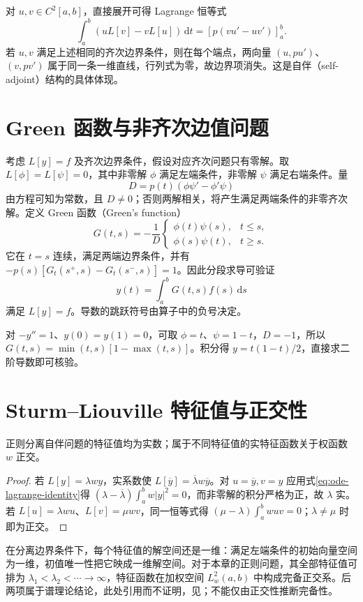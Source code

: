\documentclass[UTF8,12pt,a4paper,fontset=fandol]{ctexbook}
\begin{document}
对 $u,v\in C^2[a,b]$，直接展开可得 Lagrange 恒等式
\begin{equation}
 \int_a^b(uL[v]-vL[u])\,\mathrm dt
 =[p(vu'-uv')]_a^b.
 \label{eq:ode-lagrange-identity}
\end{equation}
若 $u,v$ 满足上述相同的齐次边界条件，则在每个端点，两向量 $(u,pu')$、$(v,pv')$ 属于同一条一维直线，行列式为零，故边界项消失。这是自伴（self-adjoint）结构的具体体现。

\section{Green 函数与非齐次边值问题}
考虑 $L[y]=f$ 及齐次边界条件，假设对应齐次问题只有零解。取 $L[\phi]=L[\psi]=0$，其中非零解 $\phi$ 满足左端条件，非零解 $\psi$ 满足右端条件。量
\[
 D=p(t)(\phi\psi'-\phi'\psi)
\]
由方程可知为常数，且 $D\ne0$；否则两解相关，将产生满足两端条件的非零齐次解。定义 Green 函数（Green's function）
\[
 G(t,s)=-\frac1D
 \begin{cases}\phi(t)\psi(s),&t\leq s,\\\phi(s)\psi(t),&t\geq s.\end{cases}
\]
它在 $t=s$ 连续，满足两端边界条件，并有 $-p(s)[G_t(s^+,s)-G_t(s^-,s)]=1$。因此分段求导可验证
\[
 y(t)=\int_a^bG(t,s)f(s)\,\mathrm ds
\]
满足 $L[y]=f$。导数的跳跃符号由算子中的负号决定。

\begin{example}
对 $-y''=1$、$y(0)=y(1)=0$，可取 $\phi=t$、$\psi=1-t$，$D=-1$，所以 $G(t,s)=\min(t,s)[1-\max(t,s)]$。积分得 $y=t(1-t)/2$，直接求二阶导数即可核验。
\end{example}

\section{Sturm--Liouville 特征值与正交性}
\begin{theorem}
正则分离自伴问题的特征值均为实数；属于不同特征值的实特征函数关于权函数 $w$ 正交。
\end{theorem}
\begin{proof}
若 $L[y]=\lambda wy$，实系数使 $L[\overline y]=\overline\lambda w\overline y$。对 $u=\overline y,v=y$ 应用式\eqref{eq:ode-lagrange-identity}得 $(\lambda-\overline\lambda)\int_a^bw|y|^2=0$，而非零解的积分严格为正，故 $\lambda$ 实。若 $L[u]=\lambda wu$、$L[v]=\mu wv$，同一恒等式得 $(\mu-\lambda)\int_a^bwuv=0$；$\lambda\ne\mu$ 时即为正交。
\end{proof}

在分离边界条件下，每个特征值的解空间还是一维：满足左端条件的初始向量空间为一维，初值唯一性把它映成一维解空间。对于本章的正则问题，其全部特征值可排为 $\lambda_1<\lambda_2<\cdots\to\infty$，特征函数在加权空间 $L^2_w(a,b)$ 中构成完备正交系。后两项属于谱理论结论，此处引用而不证明，见\cite[第5章]{teschl-ode}；不能仅由正交性推断完备性。
\end{document}
